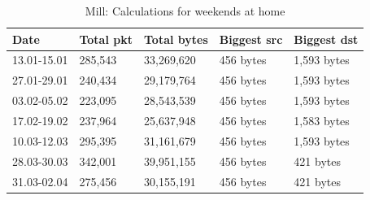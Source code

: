 \begin{table}[H]
    \centering
    \caption{Mill: Calculations for weekends at home}
    \begin{tabular}{|l|l|l|l|l|}
        \hline
        \textbf{Date}    & \textbf{Total pkt} & \textbf{Total bytes} & \textbf{Biggest src} & \textbf{Biggest dst} \\ \hline
        13.01-15.01      & 285,543            & 33,269,620           & 456 bytes            & 1,593 bytes          \\ \hline
        27.01-29.01      & 240,434            & 29,179,764           & 456 bytes            & 1,593 bytes          \\ \hline
        03.02-05.02      & 223,095            & 28,543,539           & 456 bytes            & 1,593 bytes          \\ \hline
        17.02-19.02      & 237,964            & 25,637,948           & 456 bytes            & 1,583 bytes          \\ \hline
        10.03-12.03      & 295,395            & 31,161,679           & 456 bytes            & 1,593 bytes          \\ \hline
        28.03-30.03      & 342,001            & 39,951,155           & 456 bytes            & 421 bytes            \\ \hline
        31.03-02.04      & 275,456            & 30,155,191           & 456 bytes            & 421 bytes            \\ \hline
    \end{tabular}
    \label{tab:MillHomeWeekends}
\end{table}

